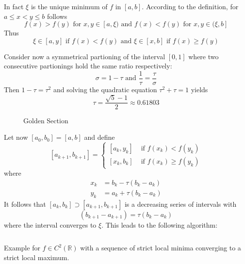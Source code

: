 In fact \( \xi \) is the unique minimum of \( f \) in \( [a, b] \). According to the definition,
for \( a \le x < y \le b \) follows
\[
    f(x) > f(y) \text{ for } x, y \in [a, \xi) \text{ and } f(x) < f(y) \text{ for }  x, y \in (\xi, b]   %
\]
Thus
\[
    \xi \in [a, y] \text{ if } f(x) < f(y) \text{ and } \xi \in [x, b] \text{ if } f(x) \ge f(y)
\]

Consider now a symmetrical partioning of the interval \( [0, 1] \) where two consecutive partionings hold
the same ratio respectively:
\[
    \sigma = 1 - \tau \text{ and } \frac{1}{\tau} = \frac{\tau}{\sigma}
\]
Then \( 1 - \tau = \tau^2 \) and solving the quadratic equation \( \tau^2 + \tau = 1 \) yields
\[
    \tau = \frac{\sqrt{5} - 1}{2} \approx 0.61803
\]
\bigskip

\begin{figure}[H]
    \centering
    \plotgoldensection{}
    \caption{Golden Section}\label{fig:golden_section}
\end{figure}
\bigskip

Let now \( [a_0, b_0] = [a, b] \) and define
\[
    [a_{k + 1}, b_{k + 1}] =
    \begin{cases}
        [a_k, y_k] & \text{ if } f(x_k) < f(y_k)   \\
        [x_k, b_k] & \text{ if } f(x_k) \ge f(y_k)
    \end{cases}
\]
where
\[
    \begin{split}
        x_k & = b_k - \tau (b_k - a_k) \\
        y_k & = a_k + \tau (b_k - a_k)
    \end{split}
\]
It follows that \( [a_k, b_k] \supset [a_{k + 1}, b_{k + 1}] \) is a decreasing series of intervals with
\[
    (b_{k + 1} - a_{k + 1}) =  \tau(b_k - a_k)
\]
where the interval converges to \( \xi \). This leads to the following algorithm:
\bigskip

\begin{algorithm}\label{algo:golden_section_search}
\end{algorithm}
\inputminted[fontsize=\small, framesep=0.35cm, frame=lines, python3=true]{python}{../jupyter/calculus/golden_section.py}
\bigskip

\begin{exercise}
    Example for \( f \in C^2(\mathbb{R}) \) with a sequence of strict local minima converging to a strict local maximum.
\end{exercise}
\bigskip


